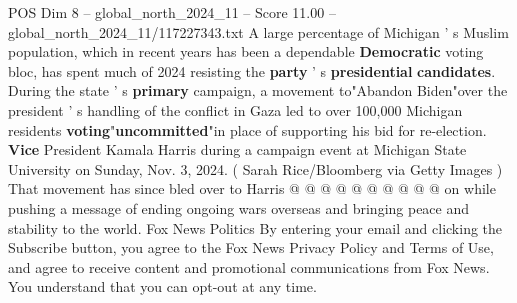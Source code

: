 \begin{textsample}{POS Dim 8 – global\_north\_2024\_11 – Score 11.00 – global\_north\_2024\_11/117227343.txt}
A large percentage of Michigan ' s Muslim population, which in recent years has been a dependable \textbf{Democratic} voting bloc, has spent much of 2024 resisting the \textbf{party} ' s \textbf{presidential} \textbf{candidates}.
During the state ' s \textbf{primary} campaign, a movement to"Abandon Biden"over the president ' s handling of the conflict in Gaza led to over 100,000 Michigan residents \textbf{voting}"\textbf{uncommitted}"in place of supporting his bid for re-election. \textbf{Vice} President Kamala Harris during a campaign event at Michigan State University on Sunday, Nov. 3, 2024. ( Sarah Rice/Bloomberg via Getty Images ) That movement has since bled over to Harris @ @ @ @ @ @ @ @ @ @ on while pushing a message of ending ongoing wars overseas and bringing peace and stability to the world.
Fox News Politics By entering your email and clicking the Subscribe button, you agree to the Fox News Privacy Policy and Terms of Use, and agree to receive content and promotional communications from Fox News.
You understand that you can opt-out at any time.

\end{textsample}
